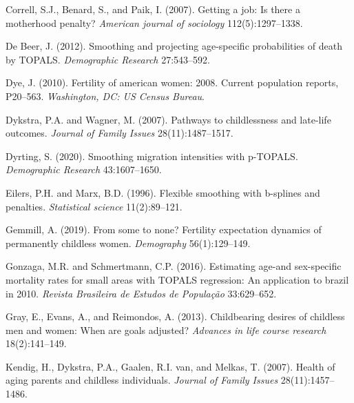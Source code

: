 \documentclass[
  11pt,
  letterpaper,
]{article}
\newlength{\cslhangindent}
\newlength{\cslentryspacingunit} %
\newenvironment{CSLReferences}[2] %
 {%
  \setlength{\parindent}{0pt}
  \ifodd #1
  \let\oldpar\par
  \def\par{\hangindent=\cslhangindent\oldpar}
  \fi
  \setlength{\parskip}{#2\cslentryspacingunit}
 }%
 {}
\begin{document}
\hypertarget{refs}{}
\begin{CSLReferences}{1}{0}
\leavevmode{}%
Correll, S.J., Benard, S., and Paik, I. (2007). Getting a job: Is there a motherhood penalty? \emph{American journal of sociology} 112(5):1297--1338.

\leavevmode{}%
De Beer, J. (2012). Smoothing and projecting age-specific probabilities of death by TOPALS. \emph{Demographic Research} 27:543--592.

\leavevmode{}%
Dye, J. (2010). Fertility of american women: 2008. Current population reports, P20--563. \emph{Washington, DC: US Census Bureau}.

\leavevmode{}%
Dykstra, P.A. and Wagner, M. (2007). Pathways to childlessness and late-life outcomes. \emph{Journal of Family Issues} 28(11):1487--1517.

\leavevmode{}%
Dyrting, S. (2020). Smoothing migration intensities with p-TOPALS. \emph{Demographic Research} 43:1607--1650.

\leavevmode{}%
Eilers, P.H. and Marx, B.D. (1996). Flexible smoothing with b-splines and penalties. \emph{Statistical science} 11(2):89--121.

\leavevmode{}%
Gemmill, A. (2019). From some to none? Fertility expectation dynamics of permanently childless women. \emph{Demography} 56(1):129--149.

\leavevmode{}%
Gonzaga, M.R. and Schmertmann, C.P. (2016). Estimating age-and sex-specific mortality rates for small areas with TOPALS regression: An application to brazil in 2010. \emph{Revista Brasileira de Estudos de Popula{ç}{ã}o} 33:629--652.

\leavevmode{}%
Gray, E., Evans, A., and Reimondos, A. (2013). Childbearing desires of childless men and women: When are goals adjusted? \emph{Advances in life course research} 18(2):141--149.

\leavevmode{}%
Kendig, H., Dykstra, P.A., Gaalen, R.I. van, and Melkas, T. (2007). Health of aging parents and childless individuals. \emph{Journal of Family Issues} 28(11):1457--1486.


\end{CSLReferences}
\end{document}
